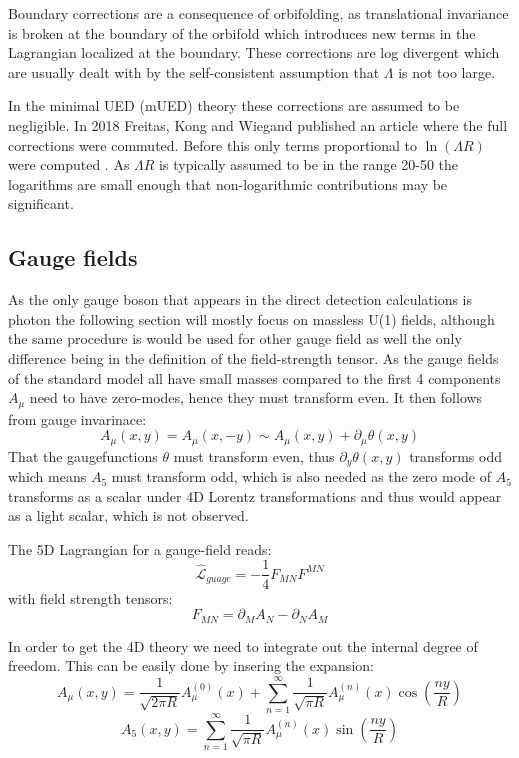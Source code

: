 \documentclass{article}
\begin{document}
Boundary corrections are a consequence of orbifolding, as translational invariance is broken at the boundary of the orbifold which introduces new terms in the Lagrangian localized at the boundary. 
These corrections are log divergent which are usually dealt with by the self-consistent assumption that $\Lambda$ is not too large.  

In the minimal UED (mUED) theory these corrections are assumed to be negligible.  
In 2018 Freitas, Kong and Wiegand published an article \cite{freitas2018radiative} where the full corrections were commuted. Before this only terms proportional to $\ln(\Lambda R)$ were computed \cite{oldcorrections}. As $\Lambda R$ is typically assumed to be in the range 20-50 the logarithms are small enough that non-logarithmic contributions may be  significant.  

\subsection{Gauge fields}
As the only gauge boson that appears in the direct detection calculations is photon the following section will mostly focus on massless U(1) fields, although the same procedure is would be used for other gauge field as well the only difference being in the definition of the field-strength tensor. 
As the gauge fields of the standard model all have small masses compared to the first 4 components $A_\mu$ need to have zero-modes, hence they must transform even. It then follows from gauge invarinace:
\begin{equation}
    A_\mu(x,y)=A_\mu(x,-y)\sim A_\mu(x,y)+\partial_\mu\theta(x,y)
\end{equation}
That the gaugefunctions $\theta$ must transform even, thus $\partial_y\theta(x,y)$ transforms odd which means  $A_5$ must transform odd, which is also needed as the zero mode of $A_5$ transforms as a scalar under 4D Lorentz transformations and thus would appear as a light scalar, which is not observed.  

The 5D Lagrangian for a gauge-field reads:
\begin{equation}
       \hat{\mathcal{L}}_{guage}=-\frac{1}{4}F_{MN}F^{MN}
\end{equation}
with field strength tensors:
\begin{equation}
    F_{MN}=\partial_M A_N-\partial_NA_M
\end{equation}

In order to get the 4D theory we need to integrate out the internal degree of freedom. This can be easily done by insering the expansion:
\begin{equation*}
    A_\mu(x,y)=\frac{1}{\sqrt{2\pi R}}A_\mu^{(0)}(x)+\sum_{n=1}^\infty \frac{1}{\sqrt{\pi R}}A_\mu^{(n)}(x)\cos(\frac{ny}{R})
\end{equation*}
\begin{equation}
    A_5(x,y)=\sum_{n=1}^\infty \frac{1}{\sqrt{\pi R}}A_\mu^{(n)}(x)\sin(\frac{ny}{R})
\end{equation}
\end{document}
